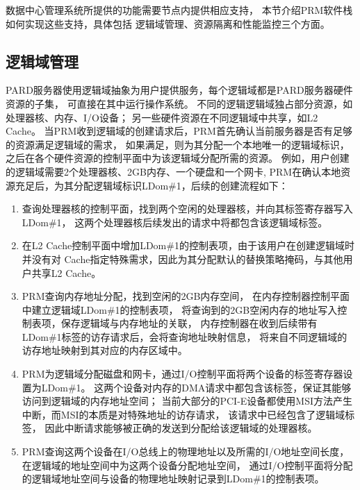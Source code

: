 数据中心管理系统所提供的功能需要节点内提供相应支持，
本节介绍PRM软件栈如何实现这些支持，具体包括
逻辑域管理、资源隔离和性能监控三个方面。

\subsection{逻辑域管理}

PARD服务器使用逻辑域抽象为用户提供服务，每个逻辑域都是PARD服务器硬件资源的子集，
可直接在其中运行操作系统。
不同的逻辑逻辑域独占部分资源，如处理器核、内存、I/O设备；
另一些硬件资源在不同逻辑域中共享，如L2 Cache。
当PRM收到逻辑域的创建请求后，PRM首先确认当前服务器是否有足够的资源满足逻辑域的需求，
如果满足，则为其分配一个本地唯一的逻辑域标识，
之后在各个硬件资源的控制平面中为该逻辑域分配所需的资源。
例如，用户创建的逻辑域需要2个处理器核、2GB内存、一个硬盘和一个网卡,
PRM在确认本地资源充足后，为其分配逻辑域标识LDom\#1，后续的创建流程如下：

\begin{enumerate}[leftmargin=2\parindent, nolistsep, label=\arabic*）]
  \item 查询处理器核的控制平面，找到两个空闲的处理器核，并向其标签寄存器写入LDom\#1，
        这两个处理器核后续发出的请求中将都包含该逻辑域标签。
  \item 在L2 Cache控制平面中增加LDom\#1的控制表项，由于该用户在创建逻辑域时并没有对
        Cache指定特殊需求，因此为其分配默认的替换策略掩码，与其他用户共享L2 Cache。
  \item PRM查询内存地址分配，找到空闲的2GB内存空间，
        在内存控制器控制平面中建立逻辑域LDom\#1的控制表项，
        将查询到的2GB空闲内存的地址写入控制表项，保存逻辑域与内存地址的关联，
        内存控制器在收到后续带有LDom\#1标签的访存请求后，会将查询地址映射信息，
        将来自不同逻辑域的访存地址映射到其对应的内存区域中。
  \item PRM为逻辑域分配磁盘和网卡，通过I/O控制平面将两个设备的标签寄存器设置为LDom\#1。
        这两个设备对内存的DMA请求中都包含该标签，保证其能够访问到逻辑域的内存地址空间；
        当前大部分的PCI-E设备都使用MSI方法产生中断，而MSI的本质是对特殊地址的访存请求，
        该请求中已经包含了逻辑域标签，
        因此中断请求能够被正确的发送到分配给该逻辑域的处理器核。
  \item PRM查询这两个设备在I/O总线上的物理地址以及所需的I/O地址空间长度，
        在逻辑域的地址空间中为这两个设备分配地址空间，
        通过I/O控制平面将分配的逻辑域地址空间与设备的物理地址映射记录到LDom\#1的控制表项。
\end{enumerate}

